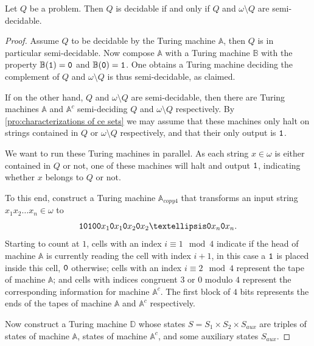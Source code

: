 \begin{pro}\label{pro:Posts theorem}
  Let \(Q\) be a problem. Then \(Q\) is decidable if and only if \(Q\) and \(ω
  \setminus Q\) are semi-decidable.
\end{pro}
\begin{proof}
  Assume \(Q\) to be decidable by the Turing machine \(\mathbb{A}\), then \(Q\)
  is in particular semi-decidable. Now compose \(\mathbb{A}\) with a Turing
  machine \(\mathbb{B}\) with the property \(\mathbb{B}(\mathtt{1}) = \mathtt{0}\) and
  \(\mathbb{B}(\mathtt{0}) = \mathtt{1}\). One obtains a Turing machine deciding the
  complement of \(Q\) and \(ω \setminus Q\) is thus semi-decidable, as claimed.

  If on the other hand, \(Q\) and \(ω \setminus Q\) are semi-decidable, then
  there are Turing machines \(\mathbb{A}\) and \(\mathbb{A}^c\) semi-deciding
  \(Q\) and \(ω \setminus Q\) respectively. By \cref{pro:characterizations of ce
  sets} we may assume that these machines only halt on strings contained in
  \(Q\) or \(ω \setminus Q\) respectively, and that their only output is
  \(\mathtt{1}\).

  We want to run these Turing machines in parallel. As each string \(x ∈ ω\) is
  either contained in \(Q\) or not, one of these machines will halt and output
  \(\mathtt{1}\), indicating whether \(x\) belongs to \(Q\) or not.

  To this end, construct a Turing machine \(\mathbb{A}_{copy4}\) that transforms
  an input string \(x_1x_2 … x_n ∈ ω\) to
  \[
    \one\zer\one\zer \zer x_1 \zer x_1 \zer x_2 \zer x_2 … \zer x_n \zer x_n.
  \]
  Starting to count at \(1\), cells with an index \(i \equiv 1 \mod 4\) indicate
  if the head of machine \(\mathbb{A}\) is currently reading the cell with index
  \(i + 1\), in this case a \(\mathtt{1}\) is placed inside this cell, \(\mathtt{0}\)
  otherwise; cells with an index \(i \equiv 2 \mod 4\) represent the tape of
  machine \(\mathbb{A}\); and cells with indices congruent \(3\) or \(0\) modulo
  \(4\) represent the corresponding information for machine \(\mathbb{A}^c\).
  The first block of \(4\) bits represents the ends of the tapes of machine
  \(\mathbb{A}\) and \(\mathbb{A}^c\) respectively.

  Now construct a Turing machine \(\mathbb{D}\) whose states \(S = S_1 \times
  S_2 \times S_{aux}\) are triples of states of machine \(\mathbb{A}\), states
  of machine \(\mathbb{A}^c\), and some auxiliary states \(S_{aux}\).


\end{proof}
